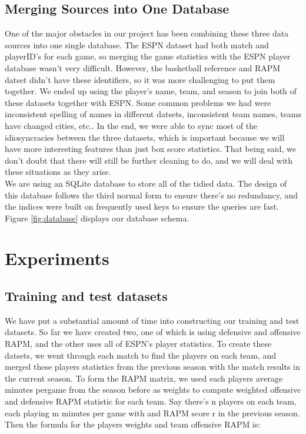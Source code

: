 \documentclass{article}
\begin{document}
	\subsection{Merging Sources into One Database}
	One of the major obstacles in our project has been combining these three data sources into one single database. The ESPN dataset had both match and playerID's for each game, so merging the game statistics with the ESPN player database wasn't very difficult. However, the basketball reference and RAPM datset didn't have these identifiers, so it was more challenging to put them together. We ended up using the player's name, team, and season to join both of these datasets together with ESPN. Some common problems we had were inconsistent spelling of names in different datsets, inconsistent team names, teams have changed cities, etc.. In the end, we were able to sync most of the idiosyncracies between the three datasets, which is important because we will have more interesting features than just box score statistics. That being said, we don't doubt that there will still be further cleaning to do, and we will deal with these situations as they arise. \\

	We are using an SQLite database to store all of the tidied data. The design of this database follows the third normal form to ensure there's no redundancy, and the indices were built on frequently used keys to ensure the queries are fast. Figure \ref{fig:database} displays our database schema. 

\section{Experiments}
	\subsection{Training and test datasets}
	We have put a substantial amount of time into constructing our training and test datasets. So far we have created two, one of which is using defensive and offensive RAPM, and the other uses all of ESPN's player statistics. To create these datsets, we went through each match to find the players on each team, and merged these players statistics from the previous season with the match results in the current season. To form the RAPM matrix, we used each players average minutes pergame from the season before as weights to compute weighted offensive and defensive RAPM statistic for each team. Say there's n players on each team, each playing m minutes per game with and RAPM score r in the previous season. Then the formula for the players weights and team offensive RAPM is:
\end{document}
